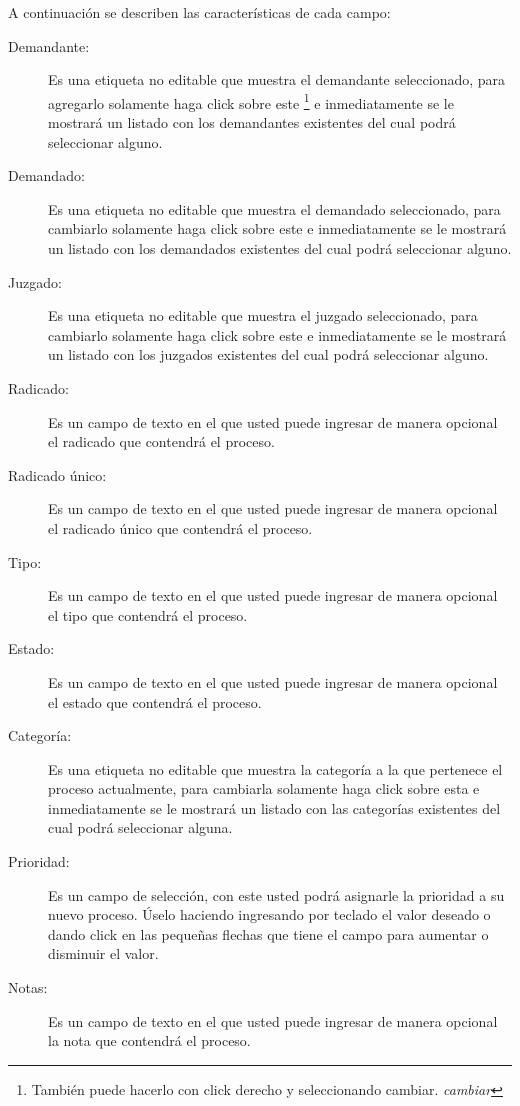  A continuaci\'on se describen las
caracter\'isticas de cada campo:
\begin{description}
\item[Demandante:]Es una etiqueta no editable que muestra el demandante
seleccionado, para agregarlo solamente haga click sobre este
\footnote{Tambi\'en puede hacerlo con click derecho y seleccionando cambiar. \emph{cambiar}}
e inmediatamente se
le mostrar\'a un listado con los demandantes existentes del cual podr\'a
seleccionar alguno.
\item[Demandado:]Es una etiqueta no editable que muestra el demandado
seleccionado, para cambiarlo solamente haga click sobre este
\footnotemark[\value{footnote}]
e inmediatamente
se le mostrar\'a un listado con los demandados existentes del cual podr\'a
seleccionar alguno.
\item[Juzgado:]Es una etiqueta no editable que muestra el juzgado
seleccionado, para cambiarlo solamente haga click sobre este
\footnotemark[\value{footnote}]
e inmediatamente
se le mostrar\'a un listado con los juzgados existentes del cual podr\'a
seleccionar alguno.
\item[Radicado:]Es un campo de texto en el que usted puede ingresar de manera
opcional el radicado que contendr\'a el proceso.
\item[Radicado \'unico:]Es un campo de texto en el que usted puede ingresar de
manera opcional el radicado \'unico que contendr\'a el proceso.
\item[Tipo:]Es un campo de texto en el que usted puede ingresar de manera
opcional el tipo que contendr\'a el proceso.
\item[Estado:]Es un campo de texto en el que usted puede ingresar de manera
opcional el estado que contendr\'a el proceso.
\item[Categor\'ia:]Es una etiqueta no editable que muestra la categor\'ia
a la que pertenece el proceso actualmente, para cambiarla solamente haga click
sobre esta
\footnotemark[\value{footnote}]
e inmediatamente
se le mostrar\'a un listado con las categor\'ias existentes del cual podr\'a
seleccionar alguna.
\item[Prioridad:]Es un campo de selecci\'on, con este usted podr\'a asignarle
la prioridad a su nuevo proceso. \'Uselo haciendo ingresando por teclado el valor deseado o dando click en las peque\~nas flechas que tiene el campo para aumentar o disminuir el valor.
\item[Notas:]Es un campo de texto en el que usted puede ingresar de manera
opcional la nota que contendr\'a el proceso.
\end{description}

